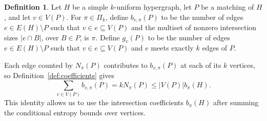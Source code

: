 \documentclass[11pt,reqno]{amsart}
\numberwithin{equation}{section}
\theoremstyle{plain}
\theoremstyle{definition}
\newtheorem{definition}[theorem]{Definition}
\begin{document}
\begin{definition}\label{def:vertex-patterns}
    Let $H$ be a simple $k$-uniform hypergraph, let $P$ be a matching of $H$, and let $v\in V(P)$.
    For $\pi\in\Pi_k$, define $b_{v,\pi}(P)$ to be the number of edges $e\in E(H)\setminus P$ such that $v\in e\subseteq V(P)$ and the multiset of nonzero intersection sizes $|e\cap B|$, over $B\in P$, is $\pi$.
    Define $g_v(P)$ to be the number of edges $e\in E(H)\setminus P$ such that $v\in e\subseteq V(P)$ and $e$ meets exactly $k$ edges of $P$.
\end{definition}

Each edge counted by $N_\pi(P)$ contributes to $b_{v,\pi}(P)$ at each of its $k$ vertices, so Definition~\ref{def:coefficients} gives
\begin{equation}\label{eq:pattern-incidences}
    \sum_{v\in V(P)}b_{v,\pi}(P)=kN_\pi(P)\le |V(P)|b_\pi(H).
\end{equation}
This identity allows us to use the intersection coefficients $b_\pi(H)$ after summing the conditional entropy bounds over vertices.
\end{document}
